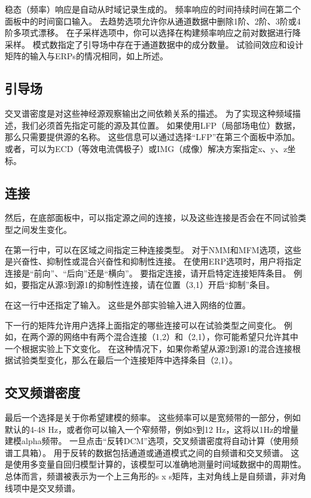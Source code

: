 稳态（频率）响应是自动从时域记录生成的。
频率响应的时间持续时间在第二个面板中的时间窗口输入。
去趋势选项允许你从通道数据中删除1阶、2阶、3阶或4阶多项式漂移。
在子采样选项中，你可以选择在构建频率响应之前对数据进行降采样。
模式数指定了引导场中存在于通道数据中的成分数量。
试验间效应和设计矩阵的输入与ERPs的情况相同，如上所述。


\subsection{引导场}

交叉谱密度是对这些神经源观察输出之间依赖关系的描述。
为了实现这种频域描述，我们必须首先指定可能的源及其位置。
如果使用LFP（局部场电位）数据，那么只需要提供源的名称。
这些信息可以通过选择“LFP”在第三个面板中添加。
或者，可以为ECD（等效电流偶极子）或IMG（成像）解决方案指定x、y、z坐标。


\subsection{连接}

然后，在底部面板中，可以指定源之间的连接，以及这些连接是否会在不同试验类型之间发生变化。

在第一行中，可以在区域之间指定三种连接类型。
对于NMM和MFM选项，这些是兴奋性、抑制性或混合兴奋性和抑制性连接。
在使用ERP选项时，用户将指定连接是“前向”、“后向”还是“横向”。
要指定连接，请开启特定连接矩阵条目。
例如，要指定从源3到源1的抑制性连接，请在位置（3,1）开启“抑制”条目。

在这一行中还指定了输入。
这些是外部实验输入进入网络的位置。

下一行的矩阵允许用户选择上面指定的哪些连接可以在试验类型之间变化。
例如，在两个源的网络中有两个混合连接（1,2）和（2,1），你可能希望只允许其中一个根据实验上下文变化。
在这种情况下，如果你希望从源2到源1的混合连接根据试验类型变化，那么在最后一个连接矩阵中选择条目（2,1）。


\subsection{交叉频谱密度}

最后一个选择是关于你希望建模的频率。
这些频率可以是宽频带的一部分，例如默认的4-48 Hz，或者你可以输入一个窄频带，例如8到12 Hz，这将以1Hz的增量建模alpha频带。
一旦点击“反转DCM”选项，交叉频谱密度将自动计算（使用频谱工具箱）。
用于反转的数据包括通道或通道模式之间的自频谱和交叉频谱。
这是使用多变量自回归模型计算的，该模型可以准确地测量时间域数据中的周期性。
总体而言，频谱被表示为一个上三角形的s x s矩阵，主对角线上是自频谱，非对角线项中是交叉频谱。


